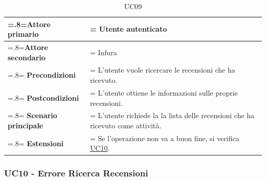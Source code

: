             \begin{table}[H]
                \centering
                \renewcommand{\arraystretch}{1.8}
                \renewcommand\tabularxcolumn[1]{m{#1}}
                \begin{tabularx}{0.9\textwidth} {
                    >{\hsize=.8\hsize\linewidth=\hsize}X
                    >{\hsize=1.2\hsize\linewidth=\hsize}X}
                    \hline
                    \textbf{Attore primario} & Utente autenticato \\
                    \hline
                    \textbf{Attore secondario} & Infura \\
                    \hline
                    \textbf{Precondizioni} & L'utente vuole ricercare le recensioni che ha ricevuto. \\
                    \hline
                    \textbf{Postcondizioni} & L'utente ottiene le informazioni sulle proprie recensioni.\\
                    \hline
                    \textbf{Scenario principale} & L'utente richiede la la lista delle recensioni che ha ricevuto come attività.\\
                    \hline
                    \textbf{Estensioni} & Se l'operazione non va a buon fine, si verifica \hyperref[UC10]{UC10}. \\
                    \hline
                \end{tabularx}
                \caption{UC09}
            \end{table}

        \subsubsection{UC10 - Errore Ricerca Recensioni}
        \label{UC10}


